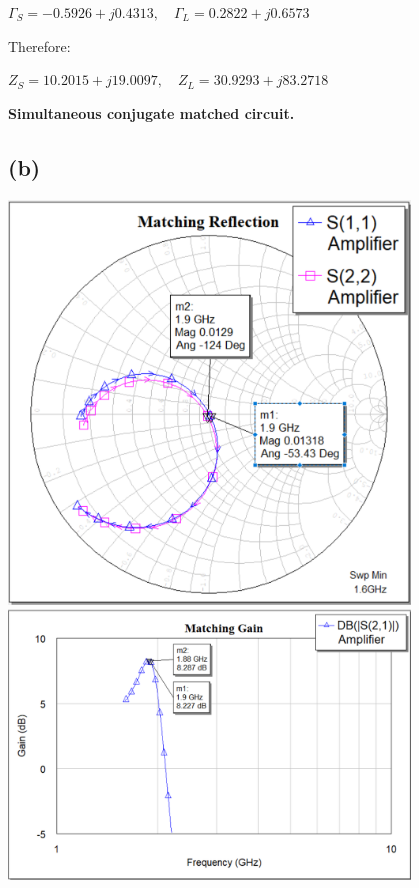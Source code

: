 \documentclass[12pt]{article}
\begin{document}
$\Gamma_S = -0.5926 + j0.4313, \quad \Gamma_L = 0.2822 + j0.6573$

Therefore:

$Z_S = 10.2015 + j19.0097, \quad Z_L = 30.9293 + j83.2718$

\begin{center}
\textbf{Simultaneous conjugate matched circuit.}
\end{center}

\subsection*{(b)}

\begin{center}
\includegraphics[width=0.8\textwidth]{3 s params.png}
\includegraphics[width=0.8\textwidth]{3 gain.png}
\end{center}
\end{document}
